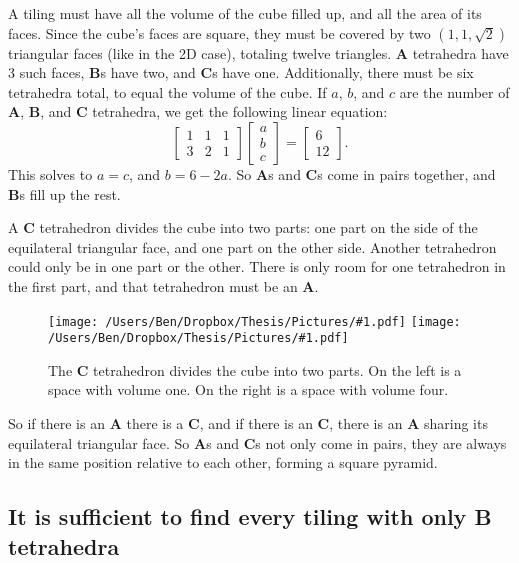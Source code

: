 \documentclass[12pt]{scrippsthesis}
\newcommand{\pic}[2]{\texttt{[image: /Users/Ben/Dropbox/Thesis/Pictures/\#1.pdf]}}
\theoremstyle{definition}
\theoremstyle{remark}
\theoremstyle{plain}
\begin{document}
A tiling must have all the volume of the cube filled up, and all the area of its faces.  Since the cube's faces are square, they must be covered by two $(1,1,\sqrt{2})$ triangular faces (like in the 2D case), totaling twelve triangles.  {\bf A} tetrahedra have 3 such faces, {\bf B}s have two, and {\bf C}s have one.  Additionally, there must be six tetrahedra total, to equal the volume of the cube.  If $a$, $b$, and $c$ are the number of {\bf A}, {\bf B}, and {\bf C} tetrahedra, we get the following linear equation:
\begin{equation}\left[\begin{array}{ccc}1&1&1\\3&2&1\end{array}\right]
\left[\begin{array}{c}a\\b\\c\end{array}\right]=
\left[\begin{array}{c}6\\12\end{array}\right].\end{equation}
This solves to $a=c$, and $b=6-2a$.  So {\bf A}s and {\bf C}s come in pairs together, and {\bf B}s fill up the rest.

A {\bf C} tetrahedron divides the cube into two parts: one part on the side of the equilateral triangular face, and one part on the other side.  Another tetrahedron could only be in one part or the other.  There is only room for one tetrahedron in the first part, and that tetrahedron must be an {\bf A}.

\begin{figure}[H]
\centerline{\hfill
\pic{Cspace1}{width=2in}\hfill
\pic{Cspace2}{width=2in}\hfill}
\caption{ The {\bf C} tetrahedron divides the cube into two parts.  On the left is a space with volume one. On the right is a space with volume four. }
\end{figure}

So if there is an {\bf A} there is a {\bf C}, and if there is an {\bf C}, there is an {\bf A} sharing its equilateral triangular face.  So {\bf A}s and {\bf C}s not only come in pairs, they are always in the same position relative to each other, forming a square pyramid.

\subsection{It is sufficient to find every tiling with only {\bf B} tetrahedra}
\end{document}
